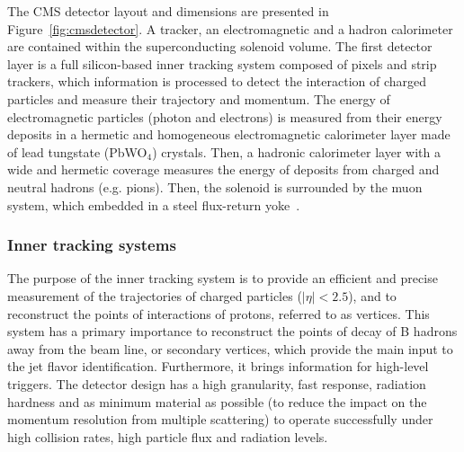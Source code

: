 The CMS detector layout and dimensions are presented in Figure~\ref{fig:cmsdetector}. A tracker, an electromagnetic and a hadron calorimeter are contained within the superconducting solenoid volume. The first detector layer is a full silicon-based inner tracking system composed of pixels and strip trackers, which information is processed to detect the interaction of charged particles and measure their trajectory and momentum. The energy of electromagnetic particles (photon and electrons) is measured from their energy deposits in a hermetic and homogeneous electromagnetic calorimeter layer made of lead tungstate (PbWO$_{4}$) crystals. Then, a hadronic calorimeter layer with a wide and hermetic coverage measures the energy of deposits from charged and neutral hadrons (e.g. pions). Then, the solenoid is surrounded by the muon system, which embedded in a steel flux-return yoke~\cite{CMS:2008xjf}.

\subsubsection{Inner tracking systems}
The purpose of the inner tracking system is to provide an efficient and precise measurement of the trajectories of charged particles ($|
\eta|<2.5$), and to reconstruct the points of interactions of protons, referred to as vertices. This system has a primary importance to reconstruct the points of decay of B hadrons away from the beam line, or secondary vertices, which provide the main input to the jet flavor identification. Furthermore, it brings information for high-level triggers. The detector design has a high granularity, fast response, radiation hardness and as minimum material as possible (to reduce the impact on the momentum resolution from multiple scattering) to operate successfully under high collision rates, high particle flux and radiation levels. 

